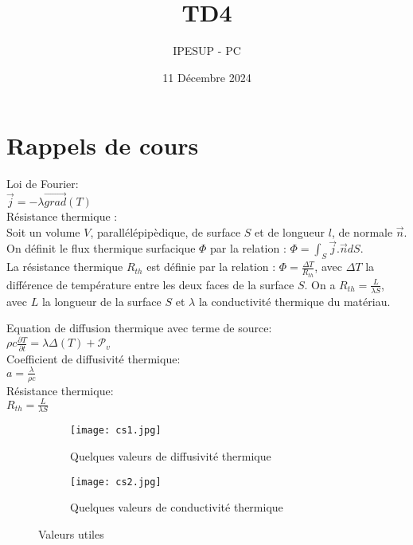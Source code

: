 \documentclass{article}
\title{TD4}
\author{IPESUP - PC }
\date{11 Décembre 2024}
\begin{document}
\maketitle



\section{Rappels de cours}
Loi de Fourier: 
\\[0.1cm]

$\vec{j}=-\lambda \vec{grad} (T) $
\\[0.1cm]

Résistance thermique : \\
Soit un volume $V$, parallélépipèdique, de surface $S$ et de longueur $l$, de normale $\vec{n}$. On définit le flux thermique surfacique $\Phi$ par la relation : $\Phi = \int_S \vec{j}.\vec{n} dS$. \\
La résistance thermique $R_{th}$ est définie par la relation : $\Phi = \frac{\Delta T}{R_{th}}$, avec $\Delta T$ la différence de température entre les deux faces de la surface $S$.
On a $R_{th} = \frac{L}{\lambda S}$, avec $L$ la longueur de la surface $S$ et $\lambda$ la conductivité thermique du matériau.

Equation de diffusion thermique avec terme de source:
\\[0.1cm]

$\rho c \frac{\partial T}{\partial t }=\lambda \Delta (T) + \mathcal{P}_v$ 
\\[0.2cm]
Coefficient de diffusivité thermique: 
\\[0.1cm]

$a=\frac{\lambda}{\rho c}$
 \\[0.1cm]

Résistance thermique: 
\\[0.1cm]

$R_{th} = \frac{L}{\lambda S}$


\begin{figure}[h]
  \centering
  \begin{subfigure}{0.3\textwidth}
    \texttt{[image: cs1.jpg]}
    \caption{Quelques valeurs de diffusivité thermique}
    \label{fig:subfig1}
  \end{subfigure}
  \hfill
  \begin{subfigure}{0.4\textwidth}
    \texttt{[image: cs2.jpg]}
    \caption{Quelques valeurs de conductivité thermique}
    \label{fig:subfig2}
  \end{subfigure}
  \caption{Valeurs utiles}
  \label{fig:general}
\end{figure}
 
\end{document}
